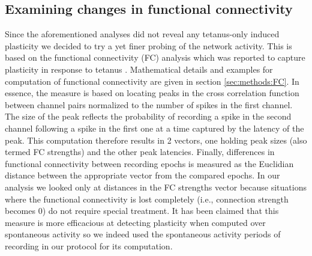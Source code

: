         \subsection{Examining changes in functional connectivity}
           Since the aforementioned analyses did not reveal any tetanus-only induced plasticity we decided to try a yet finer probing of the network activity. This is based on the functional connectivity (FC) analysis which was reported to capture plasticity in response to tetanus \cite{le2015repeated}. Mathematical details and examples for computation of functional connectivity are given in section \ref{sec:methods:FC}. In essence, the measure is based on locating peaks in the cross correlation function between channel pairs normalized to the number of spikes in the first channel. The size of the peak reflects the probability of recording a spike in the second channel following a spike in the first one at a time captured by the latency of the peak. This computation therefore results in 2 vectors, one holding peak sizes (also termed FC strengths) and the other peak latencies. Finally, differences in functional connectivity between recording epochs is measured as the Euclidian distance between the appropriate vector from the compared epochs. In our analysis we looked only at distances in the FC strengths vector because situations where the functional connectivity is lost completely (i.e., connection strength becomes 0) do not require special treatment. It has been claimed that this measure is more efficacious at detecting plasticity when computed over spontaneous activity \cite{le2015repeated} so we indeed used the spontaneous activity periods of recording in our protocol for its computation.

